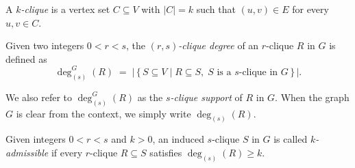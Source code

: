 \begin{definition}[$k$-Clique]\label{def:k-clique}
A \emph{$k$-clique} is a vertex set $C\subseteq V$ with $|C|=k$ such that $(u,v)\in E$ for every $u,v\in C$. 
\end{definition}


\begin{definition}\label{def:r-s-degree}
Given two integers $0 < r < s$, 
the \emph{$(r,s)$-clique degree} of an $r$-clique $R$ in $G$ is defined as
\[
  \deg_{(s)}^{G}(R)
  \;=\;
  \bigl|\,\{\,S \subseteq V \mid R \subseteq S, \; S \text{ is a } s\text{-clique in } G\,\}\,\bigr|.
\]
\end{definition}
We also refer to $\deg_{(s)}^{G}(R)$ as the \emph{$s$-clique support} of $R$ in $G$.
When the graph $G$ is clear from the context, we simply write $\deg_{(s)}(R)$.



\begin{definition}
Given integers $0 < r < s$ and $k > 0$,  
an induced $s$-clique $S$ in $G$ is called \emph{$k$-admissible} 
if every $r$-clique $R \subseteq S$ satisfies $\deg_{(s)}(R) \ge k$.
\end{definition}



